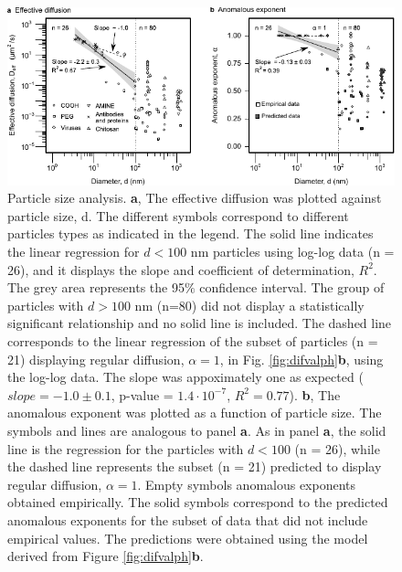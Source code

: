 \documentclass[aps,prl,preprint,superscriptaddress,showkeys,linenumbers]{revtex4-1}
\begin{document}
\begin{figure}
\centering
\includegraphics[width = 15 cm]{Figure_Size.pdf}
\caption{Particle size analysis.
\textbf{a}, The effective diffusion was plotted against particle size, d. The different symbols correspond to different particles types as indicated in the legend. The solid line indicates the linear regression for $d< 100$ nm particles using log-log data (n = 26), and it displays the slope and coefficient of determination, $R^2$. The grey area represents the 95$\%$ confidence interval. The group of particles with $d>100$ nm (n=80) did not display a statistically significant relationship and no solid line is included. The dashed line corresponds to the linear regression of the subset of particles (n = 21) displaying regular diffusion, $\alpha = 1$, in Fig. \ref{fig:difvalph}\textbf{b}, using the log-log data. The slope was appoximately one as expected ($slope = -1.0 \pm 0.1$, p-value = $1.4\cdot 10^{-7}$, $R^2=0.77$).
\textbf{b}, The anomalous exponent was plotted as a function of particle size. The symbols and lines are analogous to panel \textbf{a}. As in panel \textbf{a}, the solid line is the regression for the particles with  $d< 100$ (n = 26), while the dashed line represents the subset (n = 21) predicted to display regular diffusion, $\alpha = 1$. Empty symbols anomalous exponents obtained empirically. The solid symbols correspond to the predicted anomalous exponents for the subset of data that did not include empirical values. The predictions were obtained using the model derived from Figure \ref{fig:difvalph}\textbf{b}.
} 
\label{fig:SizeDiff}
\end{figure}

\clearpage
\end{document}
